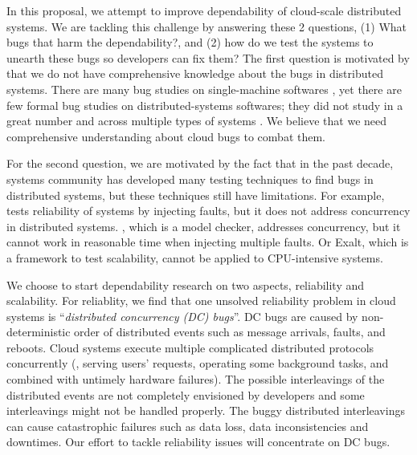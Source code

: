 In this proposal, we attempt to improve dependability of cloud-scale distributed
systems. We are tackling this challenge by answering these 2 questions, (1) What
bugs that harm the dependability?, and (2) how do we test the systems to unearth
these bugs so developers can fix them? 
%
The first question is motivated by that we do not have comprehensive knowledge
about the bugs in distributed systems. There are many bug studies on
single-machine softwares \cite{Jin+12-PerformanceBugs,
Lu+08-ConcurrencyBugStudy, Palix+11-FaultsInLinux,
Sahoo+10-StudyBugsServerSoftware}, yet there are few formal bug studies on
distributed-systems softwares; they did not study in a great number and across
multiple types of systems \cite{Li+13-ScopeBugStudy, Xiao+14-NonDetMR}. We
believe that we need comprehensive understanding about cloud bugs to combat
them.

For the second question, we are motivated by the fact that in the past decade,
systems community has developed many testing techniques
\cite{Gunawi+11-FateDestini, Guo+11-Demeter, Wang+14-Exalt, Yang+09-Modist} to
find bugs in distributed systems, but these techniques still have limitations.
For example, \fate\ \cite{Gunawi+11-FateDestini} tests reliability of systems by
injecting faults, but it does not address concurrency in distributed systems.
\modist, which is a model checker, addresses concurrency, but it cannot work in
reasonable time when injecting multiple faults. Or Exalt, which is a framework
to test scalability, cannot be applied to CPU-intensive systems. 

We choose to start dependability research on two aspects, reliability and
scalability.
%
For reliablity, we find that one unsolved reliability problem in cloud systems
is ``{\em distributed concurrency (DC) bugs}''. DC bugs are caused  by
non-deterministic order of distributed events such as message arrivals, faults,
and reboots. Cloud systems execute multiple complicated distributed protocols
concurrently (\eg, serving users' requests, operating some background tasks, and
combined with untimely hardware failures). The possible interleavings of the
distributed events are not completely envisioned by developers and some
interleavings might not be handled properly. The buggy distributed interleavings
can cause catastrophic failures such as data loss, data inconsistencies and
downtimes. Our effort to tackle reliability issues will concentrate on DC
bugs.

